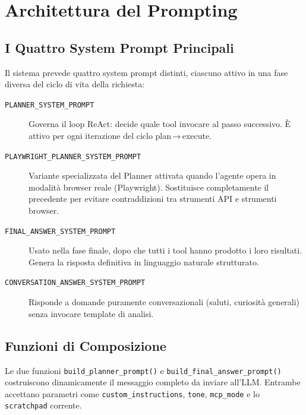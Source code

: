 \section{Architettura del Prompting}
\label{sec:prompt-arch}

\subsection{I Quattro System Prompt Principali}
\label{subsec:four-prompts}

Il sistema prevede quattro system prompt distinti, ciascuno attivo in una
fase diversa del ciclo di vita della richiesta:

\begin{description}
    \item[\texttt{PLANNER\_SYSTEM\_PROMPT}] Governa il loop ReAct: decide
        quale tool invocare al passo successivo. È attivo per ogni
        iterazione del ciclo plan\,→\,execute.

    \item[\texttt{PLAYWRIGHT\_PLANNER\_SYSTEM\_PROMPT}] Variante
        specializzata del Planner attivata quando l'agente opera in
        modalità browser reale (Playwright). Sostituisce completamente
        il precedente per evitare contraddizioni tra strumenti API e
        strumenti browser.

    \item[\texttt{FINAL\_ANSWER\_SYSTEM\_PROMPT}] Usato nella fase
        finale, dopo che tutti i tool hanno prodotto i loro risultati.
        Genera la risposta definitiva in linguaggio naturale strutturato.

    \item[\texttt{CONVERSATION\_ANSWER\_SYSTEM\_PROMPT}] Risponde a
        domande puramente conversazionali (saluti, curiosità generali)
        senza invocare template di analisi.
\end{description}

\subsection{Funzioni di Composizione}
\label{subsec:builder-functions}

Le due funzioni \texttt{build\_planner\_prompt()} e
\texttt{build\_final\_answer\_prompt()} costruiscono dinamicamente il
messaggio completo da inviare all'LLM. Entrambe accettano parametri
come \texttt{custom\_instructions}, \texttt{tone}, \texttt{mcp\_mode} e
lo \texttt{scratchpad} corrente.

